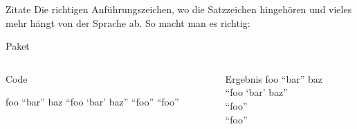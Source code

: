 \begin{frame}[fragile]{Zitate}
  Die richtigen Anführungszeichen, wo die Satzzeichen hingehören und vieles mehr hängt von der Sprache ab.
  So macht man es richtig:
  \begin{block}{Paket}
    \begin{lstverbatim}
    \usepackage[autostyle]{csquotes} %
    \end{lstverbatim}
  \end{block}
  \begin{columns}[onlytextwidth,t]
    \begin{column}{0.60\textwidth}
      \begin{block}{Code}
        \begin{lstverbatim}
        foo \enquote{bar} baz
        \enquote{foo \enquote{bar} baz}
        \textenglish{\enquote{foo}}
        \textfrench{\enquote{foo}}
        \end{lstverbatim}
      \end{block}
    \end{column}
    \begin{column}{0.36\textwidth}
      \begin{block}{Ergebnis}
        foo \enquote{bar} baz \\
        \enquote{foo \enquote{bar} baz} \\
        \textenglish{\enquote{foo}} \\
        \textfrench{ \enquote{foo}} \\
      \end{block}
    \end{column}
  \end{columns}
\end{frame}
